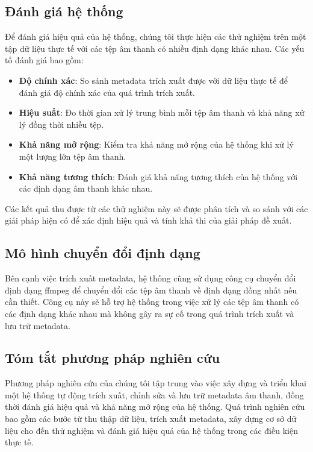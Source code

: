 \documentclass[conference]{IEEEtran}
\begin{document}
\subsection{Đánh giá hệ thống}
Để đánh giá hiệu quả của hệ thống, chúng tôi thực hiện các thử nghiệm trên một tập dữ liệu thực tế với các tệp âm thanh có nhiều định dạng khác nhau. Các yếu tố đánh giá bao gồm:
\begin{itemize}
    \item \textbf{Độ chính xác}: So sánh metadata trích xuất được với dữ liệu thực tế để đánh giá độ chính xác của quá trình trích xuất.
    \item \textbf{Hiệu suất}: Đo thời gian xử lý trung bình mỗi tệp âm thanh và khả năng xử lý đồng thời nhiều tệp.
    \item \textbf{Khả năng mở rộng}: Kiểm tra khả năng mở rộng của hệ thống khi xử lý một lượng lớn tệp âm thanh.
    \item \textbf{Khả năng tương thích}: Đánh giá khả năng tương thích của hệ thống với các định dạng âm thanh khác nhau.
\end{itemize}

Các kết quả thu được từ các thử nghiệm này sẽ được phân tích và so sánh với các giải pháp hiện có để xác định hiệu quả và tính khả thi của giải pháp đề xuất.

\subsection{Mô hình chuyển đổi định dạng}
Bên cạnh việc trích xuất metadata, hệ thống cũng sử dụng công cụ chuyển đổi định dạng ffmpeg để chuyển đổi các tệp âm thanh về định dạng đồng nhất nếu cần thiết. Công cụ này sẽ hỗ trợ hệ thống trong việc xử lý các tệp âm thanh có các định dạng khác nhau mà không gây ra sự cố trong quá trình trích xuất và lưu trữ metadata.

\subsection{Tóm tắt phương pháp nghiên cứu}
Phương pháp nghiên cứu của chúng tôi tập trung vào việc xây dựng và triển khai một hệ thống tự động trích xuất, chỉnh sửa và lưu trữ metadata âm thanh, đồng thời đánh giá hiệu quả và khả năng mở rộng của hệ thống. Quá trình nghiên cứu bao gồm các bước từ thu thập dữ liệu, trích xuất metadata, xây dựng cơ sở dữ liệu cho đến thử nghiệm và đánh giá hiệu quả của hệ thống trong các điều kiện thực tế.
\end{document}
